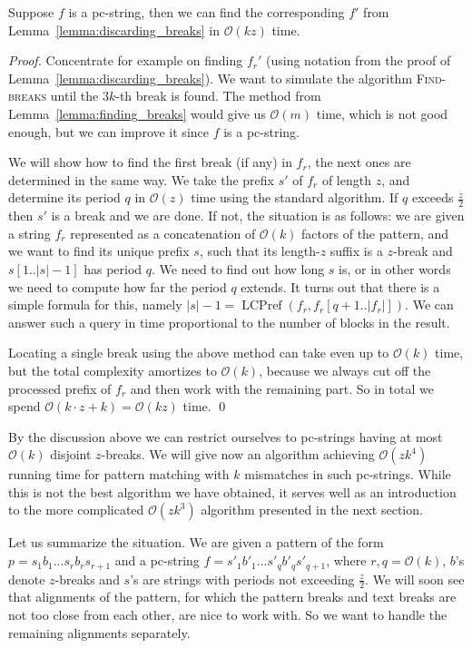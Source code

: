 \documentclass[runningheads]{llncs}
\DeclareMathOperator{\LCPref}{LCPref}
\newcommand{\proc}[1]{\textnormal{\scshape#1}}
\begin{document}
\begin{proposition}\label{proposition:algorithm_text_breaks}
Suppose $f$ is a pc-string, then we can find the corresponding $f'$ from Lemma~\ref{lemma:discarding_breaks} in $\mathcal{O}(kz)$ time.
\end{proposition}
\begin{proof}
Concentrate for example on finding $f_r'$ (using notation from the proof of Lemma~\ref{lemma:discarding_breaks}). We want to simulate the algorithm \proc{Find-breaks} until the $3k$-th break is found. The method from Lemma~\ref{lemma:finding_breaks} would give us $\mathcal{O}(m)$ time, which is not good enough, but we can improve it since $f$ is a pc-string. 

We will show how to find the first break (if any) in $f_r$, the next ones are determined in the same way. We take the prefix $s'$ of $f_r$ of length $z$, and determine its period $q$ in $\mathcal{O}(z)$ time using the standard algorithm. If $q$ exceeds $\frac{z}{2}$ then $s'$ is a break and we are done. If not, the situation is as follows: we are given a string $f_r$ represented as a concatenation of $\mathcal{O}(k)$ factors of the pattern, and we want to find its unique prefix $s$, such that its length-$z$ suffix is a $z$-break and $s[1..|s|-1]$ has period $q$.  We need to find out how long $s$ is, or in other words we need to compute how far the period $q$ extends. It turns out that there is a simple formula for this, namely $|s|-1=\LCPref(f_r,f_r[q+1..|f_r|])$. We can answer such a query in time proportional to the number of blocks in the result. 

Locating a single break using the above method can take even up to $\mathcal{O}(k)$ time, but the total complexity amortizes to $\mathcal{O}(k)$, because we always cut off the processed prefix of $f_r$ and then work with the remaining part. So in total we spend $\mathcal{O}(k\cdot z + k)=\mathcal{O}(kz)$ time. 
\qed
\end{proof}

By the discussion above we can restrict ourselves to pc-strings having at most $\mathcal{O}(k)$ disjoint $z$-breaks. We will give now an algorithm achieving $\mathcal{O}(zk^4)$ running time for pattern matching with $k$ mismatches in such pc-strings. While this is not the best algorithm we have obtained, it serves well as an introduction to the more complicated $\mathcal{O}(zk^3)$ algorithm presented in the next section. 

Let us summarize the situation. We are given a pattern of the form $p=s_1b_1...s_rb_rs_{r+1}$ and a pc-string $f=s'_1b'_1...s'_{q}b'_{q}s'_{q+1}$, where $r,q=\mathcal{O}(k)$, $b$'s denote $z$-breaks and $s$'s are strings with periods not exceeding $\frac{z}{2}$. We will soon see that alignments of the pattern, for which the pattern breaks and text breaks are not too close from each other, are nice to work with. So we want to handle the remaining alignments separately.
\end{document}
